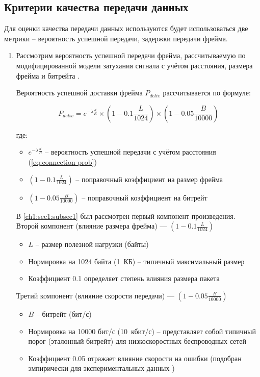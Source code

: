 \subsection{Критерии качества передачи данных} \label{ch2:sec1:sub2}

Для оценки качества передачи данных используются будет использоваться две метрики -- вероятность успешной передачи, задержки передачи фрейма.

\begin{enumerate}
    \item Рассмотрим вероятность успешной передачи фрейма, рассчитываемую по модифицированной модели затухания сигнала с учётом расстояния, размера фрейма и 
    битрейта \cite{rappaport2002wireless}.

    Вероятность успешной доставки фрейма $P_{deliv}$ рассчитывается по формуле:

    \begin{equation}
    \label{eq:error-model}
    P_{deliv} = e^{-\lambda \frac{d}{R}} \times \left(1 - 0.1 \frac{L}{1024}\right) \times \left(1 - 0.05 \frac{B}{10000}\right)
    \end{equation}

    \noindent где:
    \begin{itemize}
        \item $e^{-\lambda \frac{d}{R}}$ -- вероятность успешной передачи с учётом расстояния (\ref{eq:connection-prob})
        \item $\left(1 - 0.1 \frac{L}{1024}\right)$ -- поправочный коэффициент на размер фрейма
        \item $\left(1 - 0.05 \frac{B}{10000}\right)$ -- поправочный коэффициент на битрейт
    \end{itemize}

    В \ref{ch1:sec1:subsec1} был рассмотрен первый компонент произведения. \\
    Второй компонент (влияние размера фрейма) --- $\left(1 - 0.1 \frac{L}{1024}\right)$
    \begin{itemize}
        \item $L$ -- размер полезной нагрузки (байты)
        \item Нормировка на 1024 байта (1~КБ) -- типичный максимальный размер
        \item Коэффициент 0.1 определяет степень влияния размера пакета
    \end{itemize}

    Третий компонент (влияние скорости передачи) --- $\left(1 - 0.05 \frac{B}{10000}\right)$
    \begin{itemize}
        \item $B$ -- битрейт (бит/с)
        \item Нормировка на 10000 бит/с (10~кбит/с) -- представляет собой типичный порог (эталонный битрейт) для низкоскоростных беспроводных сетей
        \item Коэффициент 0.05 отражает влияние скорости на ошибки (подобран эмпирически для экспериментальных данных \cite{IEEE802.15.4})
    \end{itemize}


\end{enumerate}
